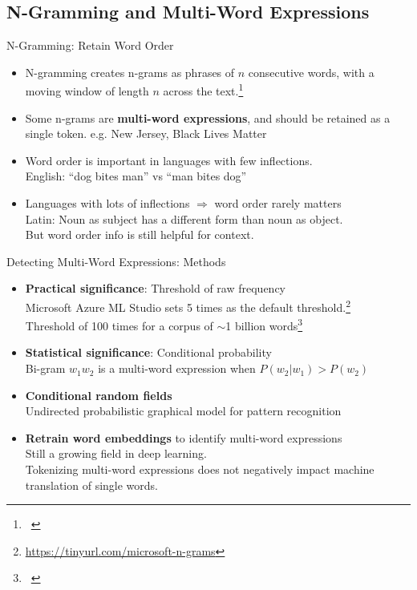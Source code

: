\documentclass{beamer}
\renewcommand{\cite}{\citep}
\begin{document}
\subsection{N-Gramming and Multi-Word Expressions}

\begin{frame}{N-Gramming: Retain Word Order}
\begin{itemize}
\item N-gramming creates n-grams as phrases of $n$ consecutive words, with a moving window of length $n$ across the text.\footnote{~\cite{gries2010lexical}}
\item Some n-grams are \textbf{multi-word expressions}, and should be retained as a single token. e.g. New Jersey, Black Lives Matter
	\bigskip
\item Word order is important in languages with few inflections.\\
	English: ``dog bites man'' vs ``man bites dog''~\cite{haspelmath1996word}
\item Languages with lots of inflections $\Rightarrow$ word order rarely matters\\
	Latin: Noun as subject has a different form than noun as object.\\
	But word order info is still helpful for context.~\cite{beier2011exploiting}
\end{itemize}
\end{frame}

\begin{frame}{Detecting Multi-Word Expressions: Methods}
\begin{itemize}
\item \textbf{Practical significance}: Threshold of raw frequency\\
Microsoft Azure ML Studio sets 5 times as the default threshold.\footnote{\url{https://tinyurl.com/microsoft-n-grams}}\\
Threshold of 100 times for a corpus of $\sim$1 billion words\footnote{~\cite{berberich2013computing}}
\item \textbf{Statistical significance}: Conditional probability~\cite{chai2017phdthesis}\\
Bi-gram $w_1 w_2$ is a multi-word expression when $P(w_2 | w_1) > P(w_2)$
	\bigskip
\item \textbf{Conditional random fields}{\footnotesize~\cite{lafferty2001conditional, maldonado2017detection}}\\
	Undirected probabilistic graphical model for pattern recognition
\item \textbf{Retrain word embeddings} to identify multi-word expressions\\
	Still a growing field in deep learning.~\cite{ashok2019comparing}\\
	Tokenizing multi-word expressions does not negatively impact machine translation of single words.~\cite{otani2020pre}
\end{itemize}
\end{frame}
\end{document}
